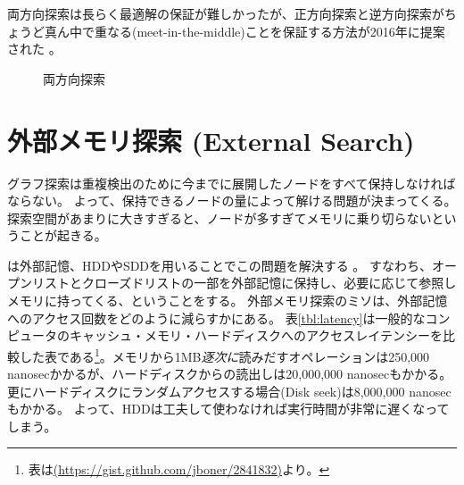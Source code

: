 両方向探索は長らく最適解の保証が難しかったが、正方向探索と逆方向探索がちょうど真ん中で重なる(meet-in-the-middle)ことを保証する方法が2016年に提案された \cite{holte2016bidirectional}。

\begin{figure}
  \centering
  \scalebox{0.75}{
  \begin{tikzpicture}[scale=0.6]
    
  \end{tikzpicture}
  }
  \caption{両方向探索}
  \label{fig:bidirectional}
\end{figure}


% 



\section{外部メモリ探索 (External Search)}
\label{sec:external-search}


グラフ探索は重複検出のために今までに展開したノードをすべて保持しなければならない。
よって、保持できるノードの量によって解ける問題が決まってくる。
探索空間があまりに大きすぎると、ノードが多すぎてメモリに乗り切らないということが起きる。

は外部記憶、HDDやSDDを用いることでこの問題を解決する \cite{chiang1995external}。
すなわち、オープンリストとクローズドリストの一部を外部記憶に保持し、必要に応じて参照しメモリに持ってくる、ということをする。
外部メモリ探索のミソは、外部記憶へのアクセス回数をどのように減らすかにある。
表\ref{tbl:latency}は一般的なコンピュータのキャッシュ・メモリ・ハードディスクへのアクセスレイテンシーを比較した表である\footnote{表は\url{(https://gist.github.com/jboner/2841832)}より。}。メモリから1MB{\it 逐次に}読みだすオペレーションは250,000 nanosecかかるが、ハードディスクからの読出しは20,000,000 nanosecもかかる。更にハードディスクにランダムアクセスする場合(Disk seek)は8,000,000 nanosecもかかる。
よって、HDDは工夫して使わなければ実行時間が非常に遅くなってしまう。%



